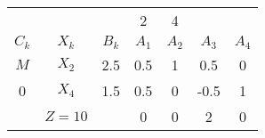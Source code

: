     \begin{tabular}{ccccccc}
    \hline
    \hline
            &         &         & 2       & 4       &         &  \bigstrut[t]\\
    $C_k$   & $X_k$   & $B_k$   & $A_1$   & $A_2$   & $A_3$   & $A_4$ \bigstrut[b]\\
    \hline
    $M$     & $X_2$   & 2.5     & 0.5     & 1       & 0.5     & 0 \bigstrut[t]\\
    0       & $X_4$   & 1.5     & 0.5     & 0       & -0.5    & 1 \bigstrut[b]\\
    \hline
            & $Z=10$  &         & 0       & 0       & 2       & 0 \bigstrut\\
    \hline
    \hline
    \end{tabular}%
